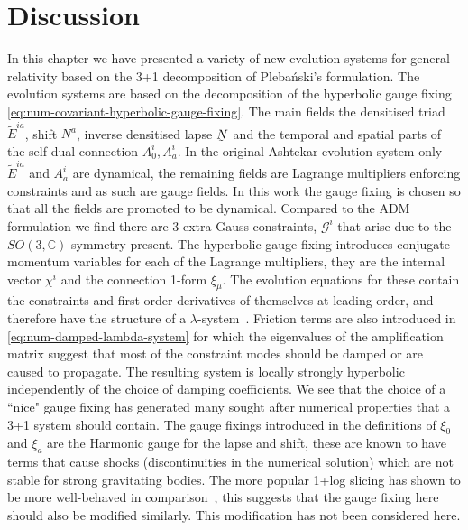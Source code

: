 \documentclass[10pt]{report}
\newcommand{\pleb}[0]{Pleba\'nski}
\newcommand{\utilde}[1]{\underaccent{\tilde}{#1}}
\theoremstyle{definition}
\newcommand{\C}[0]{\mathbb{C}}
\newcommand{\tE}[0]{\tilde{E}}
\newcommand{\dlap}[0]{\utilde{N}}
\begin{document}
    \section{Discussion}
    In this chapter we have presented a variety of new evolution systems for general relativity based on the 3+1 decomposition of \pleb{}'s formulation. The evolution systems are based on the decomposition of the hyperbolic gauge fixing \cref{eq:num-covariant-hyperbolic-gauge-fixing}. The main fields the densitised triad $\tE^{ia}$, shift $N^a$, inverse densitised lapse $\dlap$ and the temporal and spatial parts of the self-dual connection $A^i_0, A^i_a$. In the original Ashtekar evolution system only $\tE^{ia}$ and $A^i_a$ are dynamical, the remaining fields are Lagrange multipliers enforcing constraints and as such are gauge fields. In this work the gauge fixing is chosen so that all the fields are promoted to be dynamical. Compared to the ADM formulation we find there are 3 extra Gauss constraints, $\mathcal{G}^i$ that arise due to the $SO(3,\C)$ symmetry present. The hyperbolic gauge fixing introduces conjugate momentum variables for each of the Lagrange multipliers, they are the internal vector $\chi^i$ and the connection 1-form $\xi_\mu$. The evolution equations for these contain the constraints and first-order derivatives of themselves at leading order, and therefore have the structure of a $\lambda$-system~\cite{Hyperbolic_form_Yoneda_2001,Einstein_s_Equa_Brodbe_1998}. Friction terms are also introduced in \cref{eq:num-damped-lambda-system} for which the eigenvalues of the amplification matrix suggest that most of the constraint modes should be damped or are caused to propagate. The resulting system is locally strongly hyperbolic independently of the choice of damping coefficients. We see that the choice of a ``nice" gauge fixing has generated many sought after numerical properties that a 3+1 system should contain. The gauge fixings introduced in the definitions of $\xi_0$  and $\xi_a$ are the Harmonic gauge for the lapse and shift, these are known to have terms that cause shocks (discontinuities in the numerical solution) which are not stable for strong gravitating bodies. The more popular 1+log slicing has shown to be more well-behaved in comparison~\cite{Gauge_condition_Alcubi_2003}, this suggests that the gauge fixing here should also be modified similarly. This modification has not been considered here.
\end{document}
